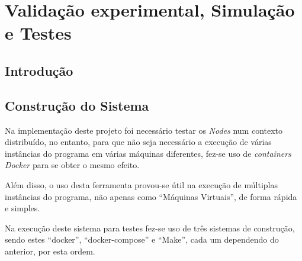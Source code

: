 \chapter{Validação experimental, Simulação e Testes}
\label{chap:validacao}

\section{Introdução}
\label{validacao:sec:introducao}

 

\section{Construção do Sistema}
\label{validacao:sec:construcao}

Na implementação deste projeto foi necessário testar os \emph{Nodes} num contexto distribuído, no entanto, para que não seja necessário a execução de várias instâncias do programa em várias máquinas diferentes, fez-se uso de \emph{containers Docker} para se obter o mesmo efeito.

Além disso, o uso desta ferramenta provou-se útil na execução de múltiplas instâncias do programa, não apenas como ``Máquinas Virtuais'', de forma rápida e simples.

Na execução deste sistema para testes fez-se uso de três sistemas de construção, sendo estes ``docker'', ``docker-compose'' e ``Make'', cada um dependendo do anterior, por esta ordem.

